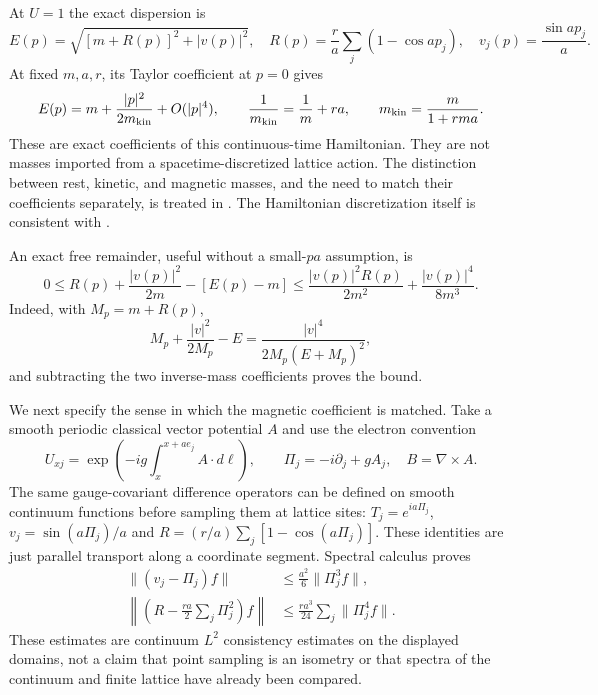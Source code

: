 At $U=1$ the exact dispersion is
\begin{equation}
 E(p)=\sqrt{[m+R(p)]^2+|v(p)|^2},\quad
 R(p)=\frac r a\sum_j(1-\cos ap_j),\quad
 v_j(p)=\frac{\sin ap_j}{a}.
 \label{nr4-dispersion}
\end{equation}
At fixed $m,a,r$, its Taylor coefficient at $p=0$ gives
\begin{equation}
 E(p)=m+\frac{|p|^2}{2m_{\rm kin}}+O(|p|^4),\qquad
 \frac1{m_{\rm kin}}=\frac1m+ra,\qquad
 m_{\rm kin}=\frac{m}{1+rma}.
 \label{nr4-kinetic-mass}
\end{equation}
These are exact coefficients of this continuous-time Hamiltonian.
They are not masses imported from a spacetime-discretized lattice action.
The distinction between rest, kinetic, and magnetic masses, and the
need to match their coefficients separately, is treated in
\cite[Eq.~(9.1) and Sec.~9]{EKM}. The Hamiltonian discretization itself
is consistent with \cite[Eq.~(3)]{Zache}.

An exact free remainder, useful without a small-$pa$ assumption, is
\begin{equation}
 0\le R(p)+\frac{|v(p)|^2}{2m}-[E(p)-m]
 \le\frac{|v(p)|^2R(p)}{2m^2}+
       \frac{|v(p)|^4}{8m^3}.
 \label{nr4-free-remainder}
\end{equation}
Indeed, with $M_p=m+R(p)$,
\[
 M_p+\frac{|v|^2}{2M_p}-E
 =\frac{|v|^4}{2M_p(E+M_p)^2},
\]
and subtracting the two inverse-mass coefficients proves the bound.

We next specify the sense in which the magnetic coefficient is matched.
Take a smooth periodic classical vector potential $A$ and use the electron
convention
\[
 U_{xj}=\exp\left(-ig\int_x^{x+ae_j}A\cdot d\ell\right),\qquad
 \Pi_j=-i\partial_j+gA_j,\quad B=\nabla\times A.
\]
The same gauge-covariant difference operators can be defined on smooth
continuum functions before sampling them at lattice sites:
$T_j=e^{ia\Pi_j}$, $v_j=\sin(a\Pi_j)/a$ and
$R=(r/a)\sum_j[1-\cos(a\Pi_j)]$. These identities are just parallel
transport along a coordinate segment. Spectral calculus proves
\begin{align}
 \|(v_j-\Pi_j)f\|&\le\frac{a^2}{6}\|\Pi_j^3f\|,\nonumber\\
 \left\|\left(R-\frac{ra}{2}\sum_j\Pi_j^2\right)f\right\|
 &\le\frac{ra^3}{24}\sum_j\|\Pi_j^4f\|.
 \label{nr4-consistency}
\end{align}
These estimates are continuum $L^2$ consistency estimates on the
displayed domains, not a claim that point sampling is an isometry or
that spectra of the continuum and finite lattice have already been
compared.

